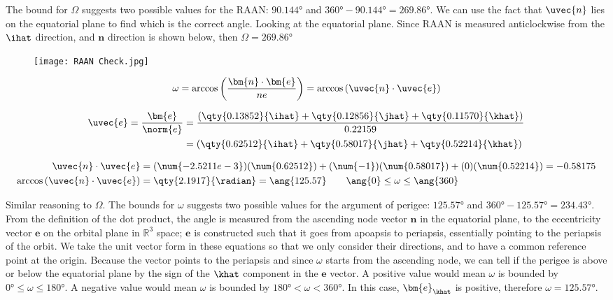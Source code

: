 \documentclass{article}
\begin{document}
{	The bound for $\Omega$ suggests two possible values for the RAAN: $\ang{90.144}$ and $\ang{360} - \ang{90.144} = \ang{269.86}$. We can use the fact that $\uvec{n}$ lies on the equatorial plane to find which is the correct angle. Looking at the equatorial plane. Since RAAN is measured anticlockwise from the $\ihat$ direction, and $\bm{n}$ direction is shown below, then $\boxed{\Omega = \ang{269.86}}$
	\begin{figure}[!h]
		\centering
		\texttt{[image: RAAN Check.jpg]}
	\end{figure}
	
	\clearpage
	
	\[
		\omega = \arccos \left( \frac{\bm{n} \cdot \bm{e}}{ne} \right) = \arccos \left( \uvec{n} \cdot \uvec{e} \right)
	\]
	
	\begin{equation*}
		\begin{split}
			\uvec{e} = \frac{\bm{e}}{\norm{e}} &= \frac{\left( \qty{0.13852}{\ihat} + \qty{0.12856}{\jhat} + \qty{0.11570}{\khat} \right)}{0.22159} \\
			&= \left( \qty{0.62512}{\ihat} + \qty{0.58017}{\jhat} + \qty{0.52214}{\khat} \right)
		\end{split}
	\end{equation*}
	
	\begin{equation*}
		\begin{split}
			\uvec{n} \cdot \uvec{e} &= (\num{-2.5211e-3})(\num{0.62512}) + (\num{-1})(\num{0.58017}) + (0)(\num{0.52214}) = -0.58175 \\
			\arccos \left( \uvec{n} \cdot \uvec{e} \right) &= \qty{2.1917}{\radian} = \ang{125.57} \qquad \ang{0} \leq \omega \leq \ang{360}
		\end{split}
	\end{equation*}
	
	Similar reasoning to $\Omega$. The bounds for $\omega$ suggests two possible values for the argument of perigee: $\ang{125.57}$ and $\ang{360} - \ang{125.57} = \ang{234.43}$. From the definition of the dot product, the angle is measured from the ascending node vector $\bm{n}$ in the equatorial plane, to the eccentricity vector $\bm{e}$ on the orbital plane in $\mathbb{R}^3$ space; $\bm{e}$ is constructed such that it goes from apoapsis to periapsis, essentially pointing to the periapsis of the orbit. We take the unit vector form in these equations so that we only consider their directions, and to have a common reference point at the origin. Because the vector points to the periapsis and since $\omega$ starts from the ascending node, we can tell if the perigee is above or below the equatorial plane by the sign of the $\khat$ component in the $\bm{e}$ vector. A positive value would mean $\omega$ is bounded by $\ang{0} \leq \omega \leq \ang{180}$. A negative value would mean $\omega$ is bounded by $\ang{180} < \omega < \ang{360}$. In this case, $\bm{e}_{\khat}$ is positive, therefore $\boxed{\omega = \ang{125.57}}$. \\
	
}
\end{document}
